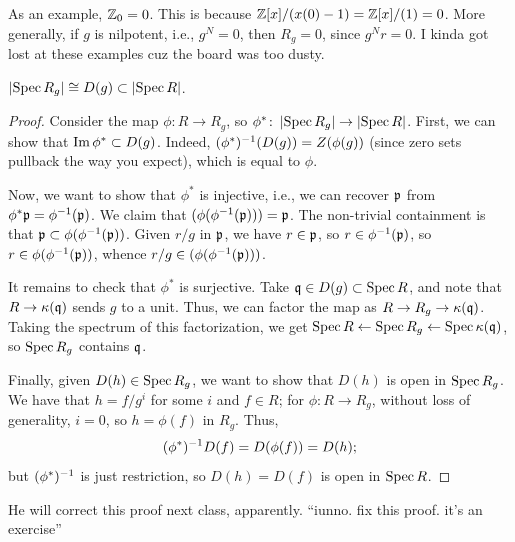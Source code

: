 As an example, $\mathbb Z_0 = 0$. This is because $\mathbb Z[x]/(x(0) - 1) = \mathbb Z[x]/(1) = 0$. More generally, if $g$ is nilpotent, i.e., $g^N = 0$, then $R_g = 0$, since $g^N r = 0$. {\color{crimson} I kinda got lost at these examples cuz the board was too dusty.}

\begin{theorem} \label{thm:spectrum_of_localization}
    $\left\lvert \operatorname{Spec} R_g \right\rvert \cong D(g) \subset \left\lvert \operatorname{Spec} R \right\rvert$.
\end{theorem}
\begin{proof}
    Consider the map $\phi \colon R \to R_g$, so $\phi^\ast \colon \left\lvert \operatorname{Spec} R_g \right\rvert \to \left\lvert \operatorname{Spec} R \right\rvert$. First, we can show that $\operatorname{Im} \phi^\ast \subset D(g)$. Indeed, $(\phi^\ast)^{-1} (D(g)) = Z(\phi(g))$ (since zero sets pullback the way you expect), which is equal to $\phi$.
    
    Now, we want to show that $\phi^\ast$ is injective, i.e., we can recover $\mathfrak p$ from $\phi^\ast \mathfrak p = \phi^{-1}(\mathfrak p)$. We claim that $(\phi(\phi^{-1}(\mathfrak p))) = \mathfrak p$. The non-trivial containment is that $\mathfrak p \subset \phi(\phi^{-1}(\mathfrak p))$. Given $r/g$ in $\mathfrak p$, we have $r \in \mathfrak p$, so $r \in \phi^{-1}(\mathfrak p)$, so $r \in \phi(\phi^{-1}(\mathfrak p))$, whence $r/g \in (\phi(\phi^{-1}(\mathfrak p)))$.

    It remains to check that $\phi^\ast$ is surjective. Take $\mathfrak q \in D(g) \subset \operatorname{Spec} R$, and note that $R \to \kappa(\mathfrak q)$ sends $g$ to a unit. Thus, we can factor the map as $R \to R_g \to \kappa(\mathfrak q)$. Taking the spectrum of this factorization, we get $\operatorname{Spec} R \leftarrow \operatorname{Spec} R_g \leftarrow \operatorname{Spec} \kappa(\mathfrak q)$, so $\operatorname{Spec} R_g$ contains $\mathfrak q$.

    Finally, given $D(h) \in \operatorname{Spec} R_g$, we want to show that $D(h)$ is open in $\operatorname{Spec} R_g$. We have that $h = f/g^i$ for some $i$ and $f \in R$; for $\phi \colon R \to R_g$, without loss of generality, $i = 0$, so $h = \phi(f)$ in $R_g$. Thus,
    \[ (\phi^\ast)^{-1} D(f) = D(\phi(f)) = D(h); \]
    but $(\phi^\ast)^{-1}$ is just restriction, so $D(h) = D(f)$ is open in $\operatorname{Spec} R$.
\end{proof}

He will correct this proof next class, apparently. {\color{airforceblue} ``iunno. fix this proof. it's an exercise''}